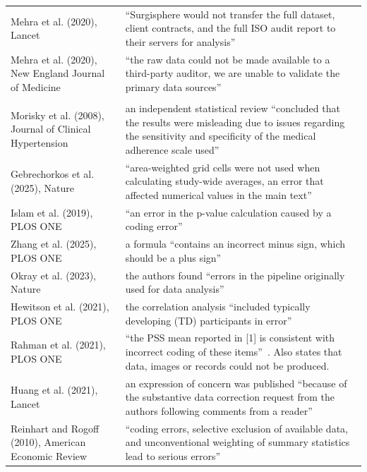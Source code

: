 {\begin{longtable}{@{}>{\raggedright\arraybackslash}p{}>{\raggedright\arraybackslash}p{}@{}}
Mehra et al. (2020), Lancet & ``Surgisphere would not transfer the full dataset, client contracts, and the full ISO audit report to their servers for analysis''~\citep{mehra2020retractionlancet} \\
Mehra et al. (2020), New England Journal of Medicine & ``the raw data could not be made available to a third-party auditor, we are unable to validate the primary data sources''~\citep{mehra2020retractionnejm} \\
\midrule
\multicolumn{2}{@{}l}{\textbf{Error inside the analysis}} \\ \nopagebreak
Morisky et al. (2008), Journal of Clinical Hypertension & an independent statistical review ``concluded that the results were misleading due to issues regarding the sensitivity and specificity of the medical adherence scale used''~\citep{wiley2023morisky} \\
Gebrechorkos et al. (2025), Nature & ``area-weighted grid cells were not used when calculating study-wide averages, an error that affected numerical values in the main text''~\citep{gebrechorkos2026retraction} \\
Islam et al. (2019), PLOS ONE & ``an error in the p-value calculation caused by a coding error''~\citep{plosone2026islam} \\
Zhang et al. (2025), PLOS ONE & a formula ``contains an incorrect minus sign, which should be a plus sign''~\citep{plosone2026zhang} \\
Okray et al. (2023), Nature & the authors found ``errors in the pipeline originally used for data analysis''~\citep{okray2026retraction} \\
Hewitson et al. (2021), PLOS ONE & the correlation analysis ``included typically developing (TD) participants in error''~\citep{plosone2024hewitson} \\
Rahman et al. (2021), PLOS ONE & ``the PSS mean reported in [1] is consistent with incorrect coding of these items''~\citep{plosone2026rahman}. Also states that data, images or records could not be produced. \\
Huang et al. (2021), Lancet & an expression of concern was published ``because of the substantive data correction request from the authors following comments from a reader''~\citep{lancet2023huang} \\
Reinhart and Rogoff (2010), American Economic Review & ``coding errors, selective exclusion of available data, and unconventional weighting of summary statistics lead to serious errors''~\citep{herndon2013debt} \\

\end{longtable}}
